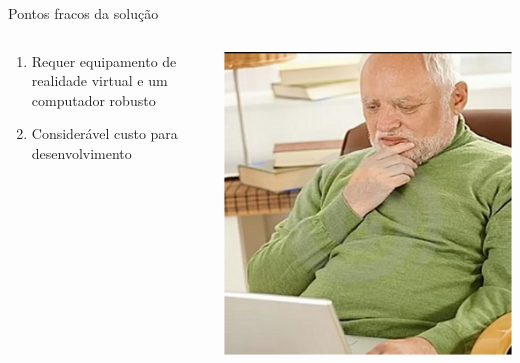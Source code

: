 \documentclass[12pt]{beamer}
\begin{document}
\begin{frame}{Pontos fracos da solução}
    \begin{columns}
        \begin{column}{0.65\textwidth}
            \begin{enumerate}[label=•]
        		\item Requer equipamento de realidade virtual e um computador robusto
        		\item Considerável custo para desenvolvimento
            \end{enumerate}
        \end{column}
        
        \begin{column}{0.35\textwidth}
            \begin{center}
                \includegraphics[width=1\textwidth]{figuras/haroldpensando.jpg}
             \end{center}
        \end{column}
    \end{columns}
\end{frame}
\end{document}
